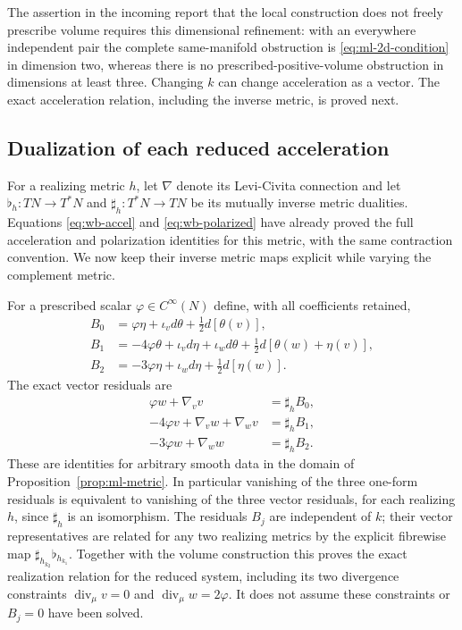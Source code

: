 The assertion in the incoming report that the local construction does
not freely prescribe volume requires this dimensional refinement:
with an everywhere independent pair the complete same-manifold
obstruction is \eqref{eq:ml-2d-condition} in dimension two, whereas there
is no prescribed-positive-volume obstruction in dimensions at least three.
Changing $k$ can change acceleration as a vector. The exact acceleration
relation, including the inverse metric, is proved next.

\subsection{Dualization of each reduced acceleration}
For a realizing metric $h$, let $\nabla$ denote its Levi-Civita
connection and let $\flat_h:TN\to T^*N$ and
$\sharp_h:T^*N\to TN$ be its mutually inverse metric dualities.
Equations \eqref{eq:wb-accel} and \eqref{eq:wb-polarized} have already
proved the full acceleration and polarization identities for this
metric, with the same contraction convention. We now keep their inverse
metric maps explicit while varying the complement metric.

For a prescribed scalar $\varphi\in C^\infty(N)$ define, with all
coefficients retained,
\begin{align}
 B_0&=\varphi\eta+\iota_vd\theta+\tfrac12d[\theta(v)],\label{eq:ml-B0}\\
 B_1&=-4\varphi\theta+\iota_vd\eta+\iota_wd\theta
                   +\tfrac12d[\theta(w)+\eta(v)],\label{eq:ml-B1}\\
 B_2&=-3\varphi\eta+\iota_wd\eta+\tfrac12d[\eta(w)].\label{eq:ml-B2}
\end{align}
The exact vector residuals are
\begin{equation}\label{eq:ml-residuals}
 \begin{split}
 \varphi w+\nabla_vv&=\sharp_h B_0,\\
 -4\varphi v+\nabla_vw+\nabla_wv&=\sharp_h B_1,\\
 -3\varphi w+\nabla_ww&=\sharp_h B_2.
 \end{split}
\end{equation}
These are identities for arbitrary smooth data in the domain of
Proposition~\ref{prop:ml-metric}. In particular vanishing of the three
one-form residuals is equivalent to vanishing of the three vector
residuals, for each realizing $h$, since $\sharp_h$ is an isomorphism.
The residuals $B_j$ are independent of $k$; their vector representatives
are related for any two realizing metrics by the explicit fibrewise map
$\sharp_{h_{k_2}}\flat_{h_{k_1}}$. Together with the volume construction
this proves the exact realization relation for the reduced system,
including its two divergence constraints
$\operatorname{div}_\mu v=0$ and $\operatorname{div}_\mu w=2\varphi$.
It does not assume these constraints or $B_j=0$ have been solved.


